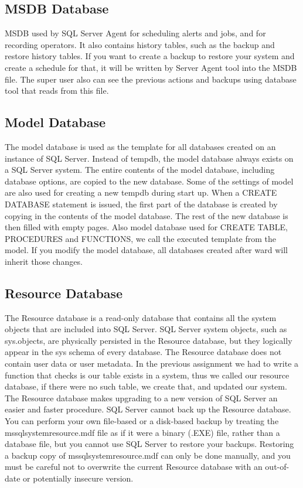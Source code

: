 \documentclass[english]{article}
\begin{document}
\subsection{MSDB Database}

MSDB used by SQL Server Agent for scheduling alerts and jobs, and for recording operators. It also contains history tables, such as the backup and restore history tables. If you want to create a backup to restore your system and create a schedule for that, it will be written by Server Agent tool into the MSDB file. The super user also can see the previous actions and backups using database tool that reads from this file. 


\subsection{Model Database}

The model database is used as the template for all databases created on an instance of SQL Server. Instead of tempdb, the model database always exists on a SQL Server system. The entire contents of the model database, including database options, are copied to the new database. Some of the settings of model are also used for creating a new tempdb during start up.
When a CREATE DATABASE statement is issued, the first part of the database is created by copying in the contents of the model database. The rest of the new database is then filled with empty pages. Also model database used for CREATE TABLE, PROCEDURES and FUNCTIONS, we call the executed template from the model.
If you modify the model database, all databases created after ward will inherit those changes.
\subsection{Resource Database}

The Resource database is a read-only database that contains all the system objects that are included into SQL Server. SQL Server system objects, such as sys.objects, are physically persisted in the Resource database, but they logically appear in the sys schema of every database. The Resource database does not contain user data or user metadata.
In the previous assignment we had to write a function that checks is our table exists in a system, thus we called our resource database, if there were no such table, we create that, and updated our system. The Resource database makes upgrading to a new version of SQL Server an easier and faster procedure.
SQL Server cannot back up the Resource database. You can perform your own file-based or a disk-based backup by treating the mssqlsystemresource.mdf file as if it were a binary (.EXE) file, rather than a database file, but you cannot use SQL Server to restore your backups. Restoring a backup copy of mssqlsystemresource.mdf can only be done manually, and you must be careful not to overwrite the current Resource database with an out-of-date or potentially insecure version.
\end{document}
